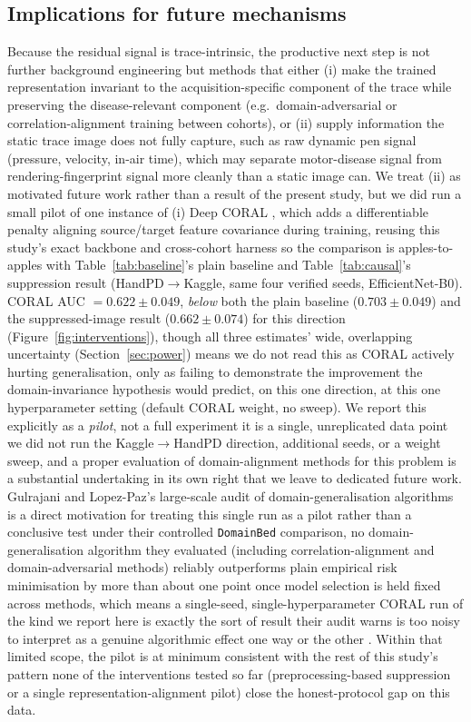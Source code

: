 \documentclass[3p,final,10pt]{elsarticle}
\let\oldsubsection\subsection
\renewcommand{\subsection}{\FloatBarrier\oldsubsection}
\begin{document}
\subsection{Implications for future mechanisms}
\label{sec:future}
Because the residual signal is trace-intrinsic, the productive next step is
not further background engineering but methods that either (i) make the
trained representation invariant to the acquisition-specific component of
the trace while preserving the disease-relevant component (e.g.\
domain-adversarial \cite{ganin2015} or correlation-alignment
\cite{sun2016coral} training between cohorts), or
(ii) supply information the static trace image does not fully capture,
such as raw dynamic pen signal (pressure, velocity, in-air time), which may
separate motor-disease signal from rendering-fingerprint signal more
cleanly than a static image can. We treat (ii) as motivated future work
rather than a result of the present study, but we did run a small pilot of
one instance of
(i) Deep CORAL \cite{sun2016coral}, which adds a differentiable
penalty aligning source/target feature covariance during training, reusing
this study's exact backbone and cross-cohort harness so the comparison is
apples-to-apples with Table~\ref{tab:baseline}'s plain baseline and
Table~\ref{tab:causal}'s suppression result (HandPD$\to$Kaggle, same four
verified seeds, EfficientNet-B0). CORAL AUC $=0.622\pm0.049$, \emph{below}
both the plain baseline ($0.703\pm0.049$) and the suppressed-image result
($0.662\pm0.074$) for this direction (Figure~\ref{fig:interventions}),
though all three estimates' wide,
overlapping uncertainty (Section~\ref{sec:power}) means we do not read this
as CORAL actively hurting generalisation, only as failing to demonstrate
the improvement the domain-invariance hypothesis would predict, on this
one direction, at this one hyperparameter setting (default CORAL weight,
no sweep). We report this explicitly as a \emph{pilot}, not a full
experiment it is a single, unreplicated data point we did not run the
Kaggle$\to$HandPD direction, additional seeds, or a weight sweep, and a
proper evaluation of domain-alignment methods for this problem is a
substantial undertaking in its own right that we leave to dedicated future
work. Gulrajani and Lopez-Paz's large-scale audit of domain-generalisation
algorithms is a direct motivation for treating this single run as a pilot
rather than a conclusive test under their controlled \texttt{DomainBed}
comparison, no domain-generalisation algorithm they evaluated (including
correlation-alignment and domain-adversarial methods) reliably outperforms
plain empirical risk minimisation by more than about one point once model
selection is held fixed across methods, which means a single-seed,
single-hyperparameter CORAL run of the kind we report here is exactly the
sort of result their audit warns is too noisy to interpret as a genuine
algorithmic effect one way or the other \cite{gulrajani2021}. Within that limited scope, the pilot is at minimum consistent with
the rest of this study's pattern none of the interventions tested so far
(preprocessing-based suppression or a single representation-alignment
pilot) close the honest-protocol gap on this data.
\end{document}
